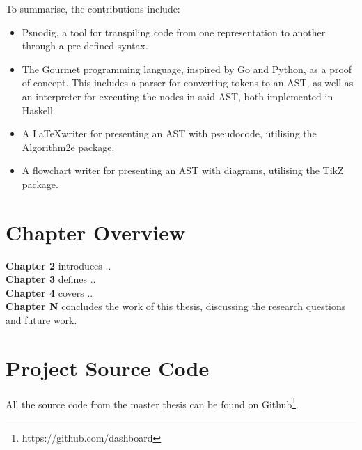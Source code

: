 To summarise, the contributions include:
\begin{itemize}
    \item Psnodig, a tool for transpiling code from one representation to another through a pre-defined syntax.
    \item The Gourmet programming language, inspired by Go and Python, as a proof of concept. This includes a parser for converting tokens to an AST, as well as an interpreter for executing the nodes in said AST, both implemented in Haskell.
    \item A \LaTeX writer for presenting an AST with pseudocode, utilising the Algorithm2e package.
    \item A flowchart writer for presenting an AST with diagrams, utilising the TikZ package.
\end{itemize}

\section{Chapter Overview}

\textbf{Chapter 2} introduces .. \hfill \\

\textbf{Chapter 3} defines .. \hfill \\

\textbf{Chapter 4} covers .. \hfill \\

\textbf{Chapter N} concludes the work of this thesis, discussing the research questions and future work.

\section{Project Source Code}

All the source code from the master thesis can be found on Github\footnote{https://github.com/dashboard}.